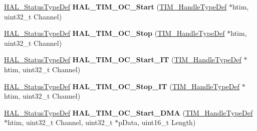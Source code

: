 \begin{DoxyCompactItemize}
\item 
\hyperlink{stm32f4xx__hal__def_8h_a63c0679d1cb8b8c684fbb0632743478f}{H\+A\+L\+\_\+\+Status\+Type\+Def} {\bfseries H\+A\+L\+\_\+\+T\+I\+M\+\_\+\+O\+C\+\_\+\+Start} (\hyperlink{struct_t_i_m___handle_type_def}{T\+I\+M\+\_\+\+Handle\+Type\+Def} $\ast$htim, uint32\+\_\+t Channel)\hypertarget{group___t_i_m___exported___functions___group2_ga5dbbafc75b341b79d29bc41f8ec15492}{}\label{group___t_i_m___exported___functions___group2_ga5dbbafc75b341b79d29bc41f8ec15492}

\item 
\hyperlink{stm32f4xx__hal__def_8h_a63c0679d1cb8b8c684fbb0632743478f}{H\+A\+L\+\_\+\+Status\+Type\+Def} {\bfseries H\+A\+L\+\_\+\+T\+I\+M\+\_\+\+O\+C\+\_\+\+Stop} (\hyperlink{struct_t_i_m___handle_type_def}{T\+I\+M\+\_\+\+Handle\+Type\+Def} $\ast$htim, uint32\+\_\+t Channel)\hypertarget{group___t_i_m___exported___functions___group2_ga9cb1f62afb99aea0db8cc28b378b68ad}{}\label{group___t_i_m___exported___functions___group2_ga9cb1f62afb99aea0db8cc28b378b68ad}

\item 
\hyperlink{stm32f4xx__hal__def_8h_a63c0679d1cb8b8c684fbb0632743478f}{H\+A\+L\+\_\+\+Status\+Type\+Def} {\bfseries H\+A\+L\+\_\+\+T\+I\+M\+\_\+\+O\+C\+\_\+\+Start\+\_\+\+IT} (\hyperlink{struct_t_i_m___handle_type_def}{T\+I\+M\+\_\+\+Handle\+Type\+Def} $\ast$htim, uint32\+\_\+t Channel)\hypertarget{group___t_i_m___exported___functions___group2_gad3116f3b344392f7b947ff1218ba9ed8}{}\label{group___t_i_m___exported___functions___group2_gad3116f3b344392f7b947ff1218ba9ed8}

\item 
\hyperlink{stm32f4xx__hal__def_8h_a63c0679d1cb8b8c684fbb0632743478f}{H\+A\+L\+\_\+\+Status\+Type\+Def} {\bfseries H\+A\+L\+\_\+\+T\+I\+M\+\_\+\+O\+C\+\_\+\+Stop\+\_\+\+IT} (\hyperlink{struct_t_i_m___handle_type_def}{T\+I\+M\+\_\+\+Handle\+Type\+Def} $\ast$htim, uint32\+\_\+t Channel)\hypertarget{group___t_i_m___exported___functions___group2_gacc324ef35c0b207a8331c657d86fc1bd}{}\label{group___t_i_m___exported___functions___group2_gacc324ef35c0b207a8331c657d86fc1bd}

\item 
\hyperlink{stm32f4xx__hal__def_8h_a63c0679d1cb8b8c684fbb0632743478f}{H\+A\+L\+\_\+\+Status\+Type\+Def} {\bfseries H\+A\+L\+\_\+\+T\+I\+M\+\_\+\+O\+C\+\_\+\+Start\+\_\+\+D\+MA} (\hyperlink{struct_t_i_m___handle_type_def}{T\+I\+M\+\_\+\+Handle\+Type\+Def} $\ast$htim, uint32\+\_\+t Channel, uint32\+\_\+t $\ast$p\+Data, uint16\+\_\+t Length)\hypertarget{group___t_i_m___exported___functions___group2_ga6f961349029a84317b7734abbfb9a02c}{}\label{group___t_i_m___exported___functions___group2_ga6f961349029a84317b7734abbfb9a02c}


\end{DoxyCompactItemize}
